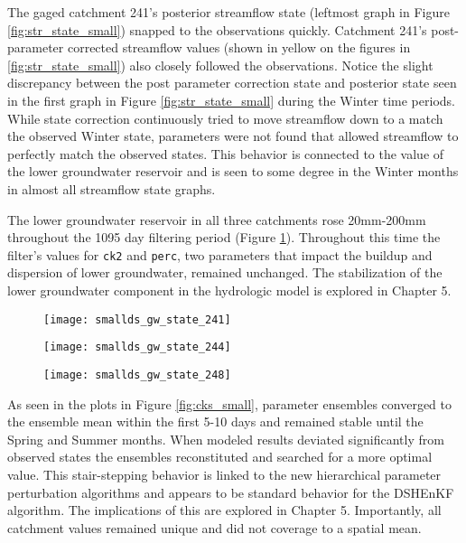 The gaged catchment 241's posterior streamflow state (leftmost graph in Figure \ref{fig:str_state_small}) snapped to the observations quickly. Catchment 241's post-parameter corrected streamflow values (shown in yellow on the figures in \ref{fig:str_state_small}) also closely followed the observations. Notice the slight discrepancy between the post parameter correction state and posterior state seen in the first graph in Figure \ref{fig:str_state_small} during the Winter time periods. While state correction continuously tried to move streamflow down to a match the observed Winter state, parameters were not found that allowed streamflow to perfectly match the observed states. This behavior is connected to the value of the lower groundwater reservoir and is seen to some degree in the Winter months in almost all streamflow state graphs.

The lower groundwater reservoir in all three catchments  rose 20mm-200mm throughout the 1095 day filtering period (Figure \ref{fig:gw_small}). Throughout this time the filter's values for \texttt{ck2} and \texttt{perc}, two parameters that impact the buildup and dispersion of lower groundwater, remained unchanged. The stabilization of the lower groundwater component in the hydrologic model is explored in Chapter 5.

\begin{figure}
\centering
\begin{minipage}{.33\textwidth}
  \centering
  \texttt{[image: smallds\_gw\_state\_241]}
  \label{fig:241gw}
\end{minipage}%
\begin{minipage}{.33\textwidth}
  \centering
  \texttt{[image: smallds\_gw\_state\_244]}
  \label{fig:244gw}
\end{minipage}
\begin{minipage}{.33\textwidth}
  \centering
  \texttt{[image: smallds\_gw\_state\_248]}
  \label{fig:248gw}
\end{minipage}
\label{fig:gw_small}
\end{figure}

As seen in the plots in Figure \ref{fig:cks_small}, parameter ensembles converged to the ensemble mean within the first 5-10 days and remained stable until the Spring and Summer months. When modeled results deviated significantly from observed states the ensembles reconstituted and searched for a more optimal value. This stair-stepping behavior is linked to the new hierarchical parameter perturbation algorithms and appears to be standard behavior for the DSHEnKF algorithm. The implications of this are explored in Chapter 5. Importantly, all catchment values remained unique and did not coverage to a spatial mean.

